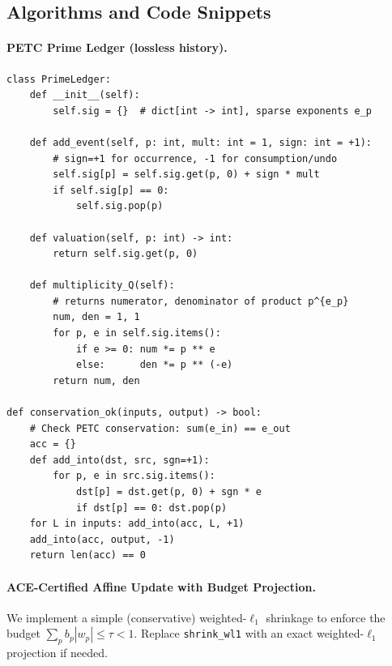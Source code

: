 \documentclass[11pt]{article}
\theoremstyle{definition}
\theoremstyle{remark}
\newcommand{\1}{\mathbf{1}}
\begin{document}
\subsection{Algorithms and Code Snippets}

\paragraph{PETC Prime Ledger (lossless history).}
\begin{verbatim}
class PrimeLedger:
    def __init__(self):
        self.sig = {}  # dict[int -> int], sparse exponents e_p

    def add_event(self, p: int, mult: int = 1, sign: int = +1):
        # sign=+1 for occurrence, -1 for consumption/undo
        self.sig[p] = self.sig.get(p, 0) + sign * mult
        if self.sig[p] == 0:
            self.sig.pop(p)

    def valuation(self, p: int) -> int:
        return self.sig.get(p, 0)

    def multiplicity_Q(self):
        # returns numerator, denominator of product p^{e_p}
        num, den = 1, 1
        for p, e in self.sig.items():
            if e >= 0: num *= p ** e
            else:      den *= p ** (-e)
        return num, den

def conservation_ok(inputs, output) -> bool:
    # Check PETC conservation: sum(e_in) == e_out
    acc = {}
    def add_into(dst, src, sgn=+1):
        for p, e in src.sig.items():
            dst[p] = dst.get(p, 0) + sgn * e
            if dst[p] == 0: dst.pop(p)
    for L in inputs: add_into(acc, L, +1)
    add_into(acc, output, -1)
    return len(acc) == 0
\end{verbatim}

\paragraph{ACE-Certified Affine Update with Budget Projection.}
We implement a simple (conservative) weighted-$\ell_1$ shrinkage to enforce the budget
$\sum_p b_p |w_p| \le \tau < 1$. Replace \texttt{shrink\_wl1} with an exact weighted-$\ell_1$ projection if needed.
\end{document}
